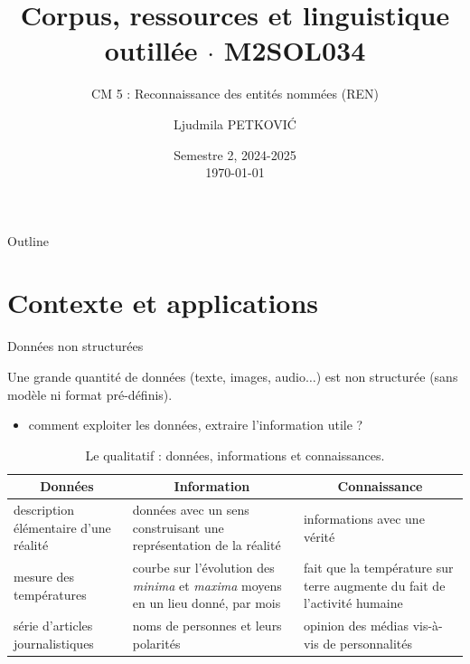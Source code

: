 \documentclass[xetex,xcolor={table,usenames,dvipsnames}]{beamer}
\begin{document}
\title{{\large Corpus, ressources et linguistique outillée $\cdot$ \textsc{M2SOL034}}}
\subtitle{CM 5 : Reconnaissance des entités nommées (\textsc{REN})}
\author{\footnotesize{Ljudmila PETKOVI\'C}}
\date{\scriptsize{Semestre 2, 2024-2025\\\today}}





	\frame{\titlepage}
	
	\begin{frame}{Outline}
		\tableofcontents
	\end{frame}

\section{Contexte et applications}

\begin{frame}{Données non structurées}
	
		Une grande quantité de données (texte, images, audio$\dots$) est \textcolor{deepred}{non structurée} (sans modèle ni format pré-définis).
		
	\begin{itemize}
	\item comment exploiter les données, \textcolor{deepred}{extraire l'information utile} ?
\end{itemize}
	
\begin{table}[h]
	\centering
	\scriptsize
	\begin{tabularx}{\textwidth}{|X|X|X|}
		\hline
		\multicolumn{1}{|c}{\textbf{Données}} & \multicolumn{1}{|c|}{\textbf{Information}} & \multicolumn{1}{c|}{\textbf{Connaissance}} \\ \hline
		description élémentaire d'une réalité & données avec un sens construisant une représentation de la réalité & informations avec une vérité \\ \hline
		mesure des températures & courbe sur l'évolution des \textit{minima} et \textit{maxima} moyens en un lieu donné, par mois & fait que la température sur terre augmente du fait de l'activité humaine \\ \hline
		série d'articles journalistiques & noms de personnes et leurs polarités & opinion des médias vis-à-vis de personnalités \\ \hline		
	\end{tabularx}
	\caption{Le qualitatif : données, informations et connaissances.}
\end{table}


\end{frame}
\end{document}
